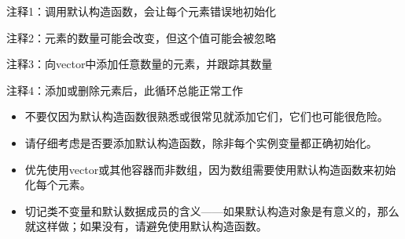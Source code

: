 {\footnotesize
注释1：调用默认构造函数，会让每个元素错误地初始化

注释2：元素的数量可能会改变，但这个值可能会被忽略

注释3：向vector中添加任意数量的元素，并跟踪其数量

注释4：添加或删除元素后，此循环总能正常工作
}


\begin{itemize}
\item
不要仅因为默认构造函数很熟悉或很常见就添加它们，它们也可能很危险。

\item
请仔细考虑是否要添加默认构造函数，除非每个实例变量都正确初始化。

\item
优先使用vector或其他容器而非数组，因为数组需要使用默认构造函数来初始化每个元素。

\item
切记类不变量和默认数据成员的含义——如果默认构造对象是有意义的，那么就这样做；如果没有，请避免使用默认构造函数。
\end{itemize}







